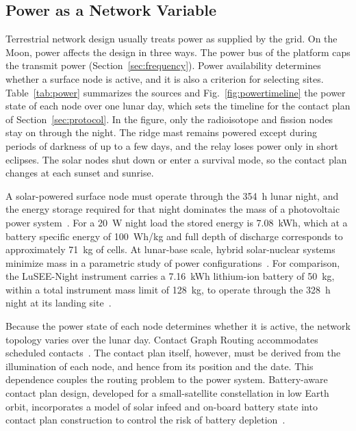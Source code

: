 \documentclass{IEEEoj}
\begin{document}
\subsection{Power as a Network Variable}
\label{sec:power}
Terrestrial network design usually treats power as supplied by the grid. On the Moon, power affects the design in three ways. The power bus of the platform caps the transmit power (Section~\ref{sec:frequency}). Power availability determines whether a surface node is active, and it is also a criterion for selecting sites. Table~\ref{tab:power} summarizes the sources and Fig.~\ref{fig:powertimeline} the power state of each node over one lunar day, which sets the timeline for the contact plan of Section~\ref{sec:protocol}. In the figure, only the radioisotope and fission nodes stay on through the night. The ridge mast remains powered except during periods of darkness of up to a few days, and the relay loses power only in short eclipses. The solar nodes shut down or enter a survival mode, so the contact plan changes at each sunset and sunrise.

A solar-powered surface node must operate through the \SI{354}{h} lunar night, and the energy storage required for that night dominates the mass of a photovoltaic power system~\cite{colozza_power1991}. For a \SI{20}{W} night load the stored energy is \SI{7.08}{kWh}, which at a battery specific energy of \SI{100}{Wh/kg} and full depth of discharge corresponds to approximately \SI{71}{kg} of cells. At lunar-base scale, hybrid solar-nuclear systems minimize mass in a parametric study of power configurations~\cite{balat_power2021}. For comparison, the LuSEE-Night instrument carries a \SI{7.16}{kWh} lithium-ion battery of \SI{50}{kg}, within a total instrument mass limit of \SI{128}{kg}, to operate through the \SI{328}{h} night at its landing site~\cite{aguirre_lusee}.

Because the power state of each node determines whether it is active, the network topology varies over the lunar day. Contact Graph Routing accommodates scheduled contacts~\cite{burleigh_cgr}. The contact plan itself, however, must be derived from the illumination of each node, and hence from its position and the date. This dependence couples the routing problem to the power system. Battery-aware contact plan design, developed for a small-satellite constellation in low Earth orbit, incorporates a model of solar infeed and on-board battery state into contact plan construction to control the risk of battery depletion~\cite{fraire_battery_cp}.
\end{document}

